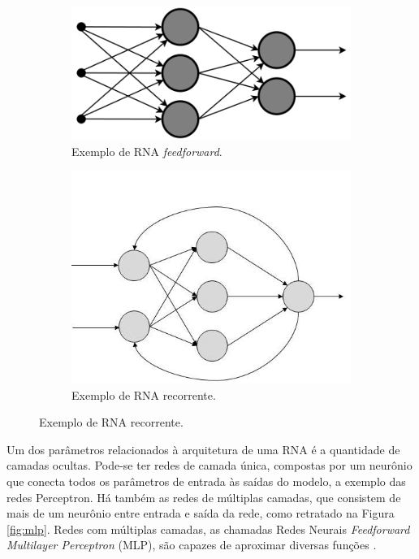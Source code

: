 \begin{figure}
	\caption{Exemplos de RNA com diferentes tipos de conexões entre neurônios.}
	\label{fig:rna_conectividade}
	\begin{subfigure}[h]{0.3\linewidth}
		\caption{Exemplo de RNA \emph{feedforward}.}
		\label{fig:feedforward}
		\includegraphics[width=\linewidth]{img/feedforward}
	\end{subfigure}
	\hfill
	\begin{subfigure}[h]{0.4\linewidth}
		\caption{Exemplo de RNA recorrente.}
		\label{fig:recorrente}
		\includegraphics[width=\linewidth]{img/recorrente}
	\end{subfigure}%
\end{figure}

Um dos parâmetros relacionados à arquitetura de uma RNA é a quantidade de camadas ocultas. Pode-se ter redes de camada única, compostas por um neurônio que conecta todos os parâmetros de entrada às saídas do modelo, a exemplo das redes Perceptron. Há também as redes de múltiplas camadas, que consistem de mais de um neurônio entre entrada e saída da rede, como retratado na Figura \ref{fig:mlp}. Redes com múltiplas camadas, as chamadas Redes Neurais \emph{Feedforward Multilayer Perceptron} (MLP), são capazes de aproximar diversas funções \cite{hornik1991approximation,braga2000redes}.

